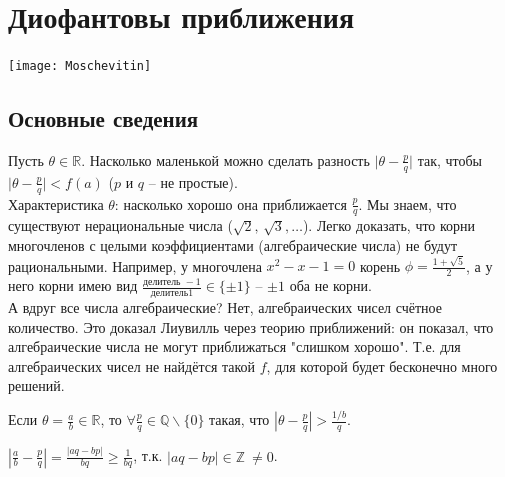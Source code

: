 \newpage

\section{Диофантовы приближения}
\texttt{[image: Moschevitin]}~\\

\subsection{Основные сведения}
	Пусть $\theta \in \mathbb{R}$. Насколько маленькой можно сделать разность $\lvert \theta - \frac{p}{q} \rvert$ так, чтобы $\lvert \theta - \frac{p}{q} \rvert < f(a)$ ($p$ и $q$ -- не простые).\\
	Характеристика $\theta$: насколько хорошо она приближается $\frac{p}{q}$. Мы знаем, что существуют нерациональные числа ($\sqrt{2}, \, \sqrt{3},\dots$). Легко доказать, что корни многочленов с целыми коэффициентами (алгебраические числа) не будут рациональными. Например, у многочлена $x^2 - x -1 =0$ корень $\phi = \frac{1+\sqrt{5}}{2}$, а у него корни имею вид $\frac{\text{делитель } -1}{\text{делитель} 1} \in \{ \pm 1 \}$ -- $\pm 1$ оба не корни.\\
	А вдруг все числа алгебраические? Нет, алгебраических чисел счётное количество. Это доказал Лиувилль через теорию приближений: он показал, что алгебраические числа не могут приближаться "слишком хорошо". Т.е. для алгебраических чисел не найдётся такой $f$, для которой будет бесконечно много решений.\\

\begin{statement}
	Если $\displaystyle \theta = \frac{a}{b} \in \mathbb{R}$, то $\displaystyle \forall \frac{p}{q} \in \mathbb{Q} \backslash \{ 0 \}$ такая, что
	$\displaystyle \left| \theta - \frac{p}{q} \right| > \frac{1/b}{q}$.
\end{statement}
\begin{pf}
	$\displaystyle \left| \frac{a}{b} - \frac{p}{q} \right| = \frac{|aq - bp|}{bq} \geq \frac{1}{bq}$, т.к. $|aq-bp| \in \mathbb{Z} \ \ne 0$.
\end{pf}

